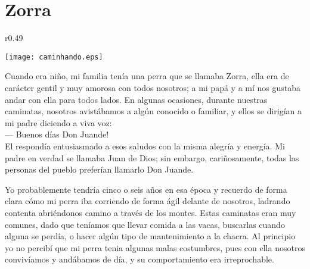 \cleardoublepage
\newpage
\ifdefined\EnableIncludeImages
\fi
\chapter{Zorra}


\ifdefined\EnableIncludeImages
\begin{wrapfigure}{r}{0.49\textwidth}
  \begin{center}
  \vspace{-30pt}
    \texttt{[image: caminhando.eps]}
  \end{center}
  \vspace{-20pt}
\end{wrapfigure}
\fi
Cuando era niño, mi familia tenía una perra que se llamaba Zorra, ella era de carácter gentil y muy amorosa con todos nosotros; a mi papá y a mí nos gustaba andar con ella para todos lados. En algunas ocasiones, durante nuestras caminatas, nosotros avistábamos a algún conocido o familiar, y ellos se dirigían a mi padre diciendo a viva voz:\\\indent
--- Buenos días Don Juande!\\\indent
El respondía entusiasmado a esos saludos con la misma alegría y energía.
Mi padre en verdad se llamaba Juan de Dios; sin embargo, cariñosamente, todas las personas del pueblo preferían llamarlo Don Juande.

Yo probablemente tendría cinco o seis años en esa época y recuerdo de forma clara cómo mi perra iba corriendo de forma ágil delante de nosotros, ladrando contenta abriéndonos camino a través de los montes.
Estas caminatas eran muy comunes, dado que teníamos que llevar comida a las vacas, buscarlas cuando alguna se perdía, o hacer algún tipo de mantenimiento a la chacra.
Al principio yo no percibí que mi perra tenia algunas malas costumbres, pues con ella nosotros convivíamos y andábamos de día, y su comportamiento era irreprochable.

